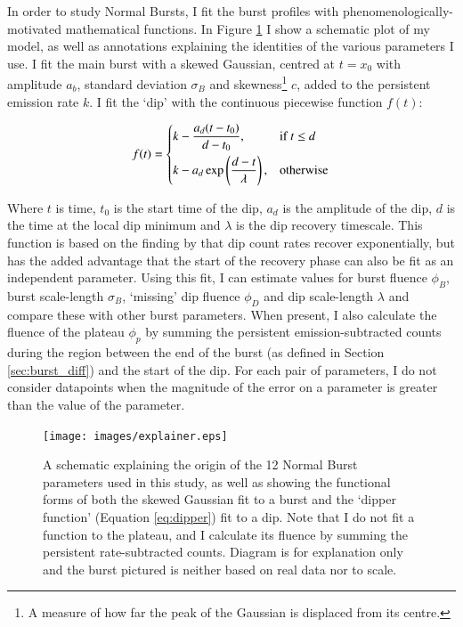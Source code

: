 \par In order to study Normal Bursts, I fit the burst profiles with phenomenologically-motivated mathematical functions.  In Figure \ref{fig:explain} I show a schematic plot of my model, as well as annotations explaining the identities of the various parameters I use.  I fit the main burst with a skewed Gaussian, centred at $t=x_0$ with amplitude $a_b$, standard deviation $\sigma_B$ and skewness\footnote{A measure of how far the peak of the Gaussian is displaced from its centre.} $c$, added to the persistent emission rate $k$.  I fit the `dip' with the continuous piecewise function $f(t)$:

\begin{equation}
f(t)=
\begin{dcases}
k-\frac{a_d(t-t_0)}{d-t_0}, & \text{if } t\leq d\\
k-a_d\exp\left(\frac{d-t}{\lambda}\right), & \text{otherwise}
\end{dcases}
\label{eq:dipper}
\end{equation}

Where $t$ is time, $t_0$ is the start time of the dip, $a_d$ is the amplitude of the dip, $d$ is the time at the local dip minimum and $\lambda$ is the dip recovery timescale.  This function is based on the finding by \citet{Younes_Expo} that dip count rates recover exponentially, but has the added advantage that the start of the recovery phase can also be fit as an independent parameter.  Using this fit, I can estimate values for burst fluence $\phi_B$, burst scale-length $\sigma_B$, `missing' dip fluence $\phi_D$ and dip scale-length $\lambda$ and compare these with other burst parameters.  When present, I also calculate the fluence of the plateau $\phi_p$ by summing the persistent emission-subtracted counts during the region between the end of the burst (as defined in Section \ref{sec:burst_diff}) and the start of the dip.  For each pair of parameters, I do not consider datapoints when the magnitude of the error on a parameter is greater than the value of the parameter.

\begin{figure}
  \centering
  \texttt{[image: images/explainer.eps]}
  \caption[A schematic explaining the origin of the 12 Normal Burst parameters used in this study.]{\small A schematic explaining the origin of the 12 Normal Burst parameters used in this study, as well as showing the functional forms of both the skewed Gaussian fit to a burst and the `dipper function' (Equation \ref{eq:dipper}) fit to a dip.  Note that I do not fit a function to the plateau, and I calculate its fluence by summing the persistent rate-subtracted counts.  Diagram is for explanation only and the burst pictured is neither based on real data nor to scale.}
  \label{fig:explain}
\end{figure}

